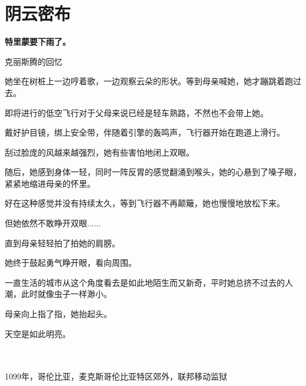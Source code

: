 \documentclass[openany]{book}
\begin{document}
\chapter{阴云密布}
\begin{center} \textbf{特里蒙要下雨了。}\end{center} \par
\clearpage
{
    \begin{center}克丽斯腾的回忆\end{center}\par
    她坐在树桩上一边哼着歌，一边观察云朵的形状。等到母亲喊她，她才蹦跳着跑过去。\par
    即将进行的低空飞行对于父母来说已经是轻车熟路，不然也不会带上她。\par
    戴好护目镜，绑上安全带，伴随着引擎的轰鸣声，飞行器开始在跑道上滑行。\par
    刮过脸庞的风越来越强烈，她有些害怕地闭上双眼。\par
    随后，她感到身体一轻，同时一阵反胃的感觉翻涌到喉头，她的心悬到了嗓子眼，紧紧地缩进母亲的怀里。\par
    好在这种感觉并没有持续太久，等到飞行器不再颠簸，她也慢慢地放松下来。\par
    但她依然不敢睁开双眼......\par
    直到母亲轻轻拍了拍她的肩膀。\par
    她终于鼓起勇气睁开眼，看向周围。\par
    一直生活的城市从这个角度看去是如此地陌生而又新奇，平时她总挤不过去的人潮，此时就像虫子一样渺小。\par
    母亲向上指了指，她抬起头。\par
    天空是如此明亮。}\\
\\
1099年，哥伦比亚，麦克斯哥伦比亚特区郊外，联邦移动监狱\par
\end{document}

